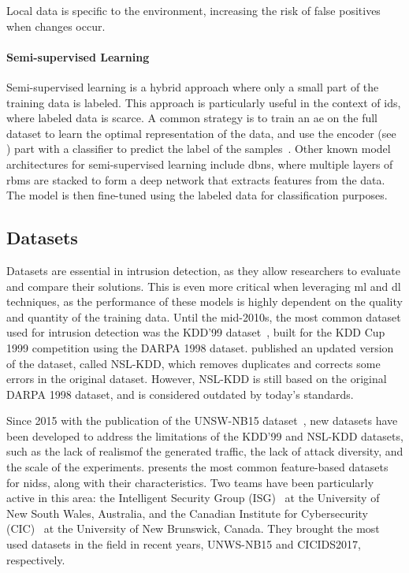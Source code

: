 \begin{challenge}
  Local data is specific to the environment, increasing the risk of false positives when changes occur.
  \label{chall:specificity}
\end{challenge}


\paragraph{Semi-supervised Learning}

Semi-supervised learning is a hybrid approach where only a small part of the training data is labeled.
This approach is particularly useful in the context of \gls{ids}, where labeled data is scarce.
A common strategy is to train an \gls{ae} on the full dataset to learn the optimal representation of the data, and use the encoder (see ) part with a classifier to predict the label of the samples~\cite{aouedi_SemisupervisedStackedAutoencoder_2020}.
Other known model architectures for semi-supervised learning include \glspl{dbn}, where multiple layers of \glspl{rbm} are stacked to form a deep network that extracts features from the data.
The model is then fine-tuned using the labeled data for classification purposes.


\subsection{Datasets\label{sec:bg.ids.datasets}}

Datasets are essential in intrusion detection, as they allow researchers to evaluate and compare their solutions.
This is even more critical when leveraging \gls{ml} and \gls{dl} techniques, as the performance of these models is highly dependent on the quality and quantity of the training data.
Until the mid-2010s, the most common dataset used for intrusion detection was the {KDD'99} dataset~\cite{kddcup99}, built for the KDD Cup 1999 competition using the DARPA 1998 dataset.
\Textcite{tavallaee_detailedanalysisKDD_2009} published an updated version of the dataset, called NSL-KDD, which removes duplicates and corrects some errors in the original dataset.
However, NSL-KDD is still based on the original DARPA 1998 dataset, and is considered outdated by today's standards.

Since 2015 with the publication of the UNSW-NB15 dataset~\cite{moustafa_UNSWNB15comprehensivedata_2015}, new datasets have been developed to address the limitations of the KDD'99 and NSL-KDD datasets, such as the lack of realism\footnotemark of the generated traffic, the lack of attack diversity, and the scale of the experiments.
 presents the most common feature-based datasets for \glspl{nids}, along with their characteristics.
Two teams have been particularly active in this area: the Intelligent Security Group (ISG)~\cite{moustafa_UNSWNB15comprehensivedata_2015,koroniotis_developmentrealisticbotnet_2019,moustafa_newdistributedarchitecture_2021} at the University of New South Wales, Australia, and the Canadian Institute for Cybersecurity (CIC)~\cite{sharafaldin_GeneratingNewIntrusion_2018} at the University of New Brunswick, Canada.
They brought the most used datasets in the field in recent years, UNWS-NB15 and CICIDS2017, respectively.

